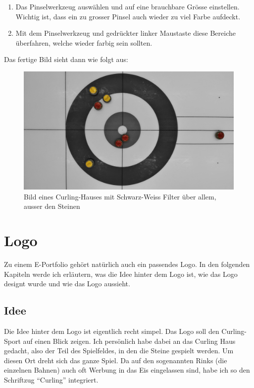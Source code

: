 \documentclass[11pt]{article}
\begin{document}
\begin{enumerate}
        \item Das Pinselwerkzeug auswählen und auf eine brauchbare Grösse einstellen. Wichtig ist, dass ein zu grosser
        Pinsel auch wieder zu viel Farbe aufdeckt.
        \item Mit dem Pinselwerkzeug und gedrückter linker Maustaste diese Bereiche überfahren, welche wieder
        farbig sein sollten.
    \end{enumerate}

    \pagebreak
    Das fertige Bild sieht dann wie folgt aus:\\

    \begin{figure}[h]
        \includegraphics[width=\textwidth]{media/edited}
        \caption{Bild eines Curling-Hauses mit Schwarz-Weiss Filter über allem, ausser den Steinen}
    \end{figure}


    \section{Logo}
    Zu einem E-Portfolio gehört natürlich auch ein passendes Logo. In den folgenden Kapiteln werde ich erläutern, was
    die Idee hinter dem Logo ist, wie das Logo designt wurde und wie das Logo aussieht.

    \subsection{Idee}
    Die Idee hinter dem Logo ist eigentlich recht simpel. Das Logo soll den Curling-Sport auf einen Blick zeigen. Ich
    persönlich habe dabei an das Curling Haus gedacht, also der Teil des Spielfeldes, in den die Steine gespielt werden.
    Um diesen Ort dreht sich das ganze Spiel. Da auf den sogenannten Rinks (die einzelnen Bahnen) auch oft Werbung in
    das Eis eingelassen sind, habe ich so den Schriftzug ``Curling'' integriert.
\end{document}
